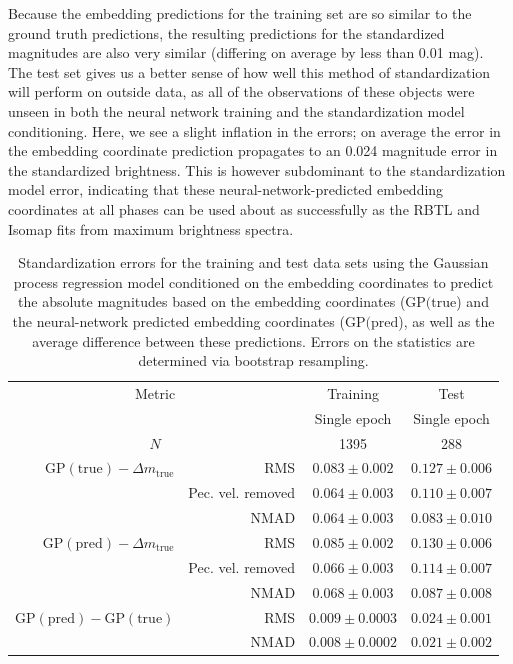 Because the embedding predictions for the training set are so similar to the ground truth predictions, the resulting predictions for the standardized magnitudes are also very similar (differing on average by less than 0.01 mag). The test set gives us a better sense of how well this method of standardization will perform on outside data, as all of the observations of these objects were unseen in both the neural network training and the standardization model conditioning. Here, we see a slight inflation in the errors; on average the error in the embedding coordinate prediction propagates to an 0.024 magnitude error in the standardized brightness. This is however subdominant to the standardization model error, indicating that these neural-network-predicted embedding coordinates at all phases can be used about as successfully as the RBTL and Isomap fits from maximum brightness spectra.

\begin{table}[htbp]
    \centering
    \begin{tabular}{rrcc}\toprule
    \multicolumn{2}{c}{Metric} & Training & Test\\
    \multicolumn{2}{c}{} & Single epoch & Single epoch\\\midrule
    \multicolumn{2}{c}{$N$} & 1395 & 288\\\midrule 
    $\textrm{GP}(\textrm{true}) - \Delta m_\textrm{true}$ & RMS & 
        $0.083\pm 0.002$ & $0.127\pm 0.006$\\
    & Pec. vel. removed &
        $0.064\pm 0.003$ & $0.110\pm 0.007$\\
    & NMAD & 
        $0.064\pm 0.003$ & $0.083\pm 0.010$\\
     $\textrm{GP}(\textrm{pred}) - \Delta m_\textrm{true}$ & RMS & 
        $0.085\pm 0.002$ & $0.130\pm 0.006$\\
    & Pec. vel. removed & 
        $0.066\pm 0.003$ & $0.114\pm 0.007$\\
    & NMAD & 
        $0.068\pm 0.003$ & $0.087\pm 0.008$\\\midrule
     $\textrm{GP}(\textrm{pred}) - \textrm{GP}(\textrm{true})$ & RMS & 
        $0.009\pm 0.0003$ & $0.024\pm 0.001$\\
    & NMAD & 
        $0.008\pm 0.0002$ & $0.021\pm 0.002$\\\bottomrule
    \end{tabular}
    \caption{Standardization errors for the training and test data sets using the Gaussian process regression model conditioned on the  embedding coordinates to predict the absolute magnitudes based on the  embedding coordinates ($\textrm{GP}(\textrm{true}$) and the \stoe{} neural-network predicted embedding coordinates ($\textrm{GP}(\textrm{pred}$), as well as the average difference between these predictions. Errors on the statistics are determined via bootstrap resampling.}
    \label{tab:standardization_nn_results}
\end{table}

